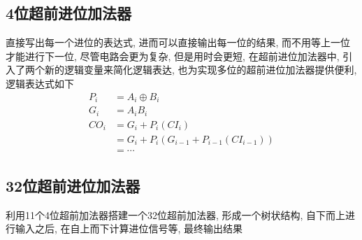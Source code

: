 \documentclass[fontset=windows,12pt]{article}
\begin{document}
    \subsection{4位超前进位加法器}
        直接写出每一个进位的表达式, 进而可以直接输出每一位的结果, 而不用等上一位才能进行下一位, 尽管电路会更为复杂, 
        但是用时会更短, 在超前进位加法器中, 引入了两个新的逻辑变量来简化逻辑表达, 也为实现多位的超前进位加法器提供便利, 逻辑表达式如下
        \begin{align*}
            P_i&=A_i \oplus B_i\\
            G_i&=A_iB_i\\
            CO_i&=G_i+P_i(CI_i)\\
                &=G_i+P_i(G_{i-1}+P_{i-1}(CI_{i-1}))\\
                &=\cdots
        \end{align*}
    \subsection{32位超前进位加法器}
        利用11个4位超前加法器搭建一个32位超前加法器, 形成一个树状结构, 自下而上进行输入之后, 在自上而下计算进位信号等, 最终输出结果
\end{document}
